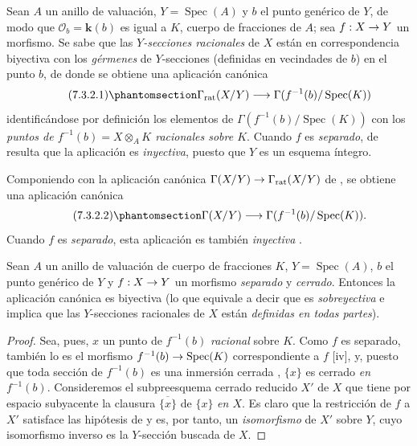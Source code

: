 \documentclass[oneside,10pt]{amsart}
\makeatletter
\newcommand{\ega@arrow}[2]{\mathchoice{#1}{#2}{#2}{#2}}
\renewcommand{\to}{\ega@arrow{\longrightarrow}{\rightarrow}}
\let\EGAOriginalLabel\label
\renewcommand{\label}[1]{\phantomsection\EGAOriginalLabel{#1}}
\makeatother
\begin{document}
\begin{env}[7.3.2]
\label{II.7.3.2-fr}
Sean $A$ un anillo de valuación, $Y=\operatorname{Spec}(A)$ y $b$ el punto genérico de $Y$, de modo que $\mathcal{O}_b=\boldsymbol{k}(b)$ es igual a $K$, cuerpo de fracciones de $A$;
sea $f:X\to Y$ un morfismo.
Se sabe  que las \emph{$Y$-secciones racionales} de $X$ están en correspondencia biyectiva con los \emph{gérmenes} de $Y$-secciones (definidas en vecindades de $b$) en el punto $b$, de donde se obtiene una aplicación canónica
\[
\tag{7.3.2.1}
\label{II.7.3.2.1-fr}
\Gamma_{\mathrm{rat}}(X/Y)\longrightarrow
\Gamma(f^{-1}(b)/\operatorname{Spec}(K))
\]
identificándose por definición  los elementos de $\Gamma(f^{-1}(b)/\operatorname{Spec}(K))$ con los \emph{puntos de $f^{-1}(b)=X\otimes_AK$ racionales sobre $K$}.
Cuando $f$ es \emph{separado}, de  resulta que la aplicación  es \emph{inyectiva}, puesto que $Y$ es un esquema íntegro.

Componiendo  con la aplicación canónica
$\Gamma(X/Y)\to\Gamma_{\mathrm{rat}}(X/Y)$
de , se obtiene una aplicación canónica
\[
\tag{7.3.2.2}
\label{II.7.3.2.2-fr}
\Gamma(X/Y)\longrightarrow \Gamma(f^{-1}(b)/\operatorname{Spec}(K)).
\]
Cuando $f$ es \emph{separado}, esta aplicación es también \emph{inyectiva} .
\end{env}


\begin{proposition}[7.3.3]
\label{II.7.3.3-fr}
Sean $A$ un anillo de valuación de cuerpo de fracciones $K$, $Y=\operatorname{Spec}(A)$, $b$ el punto genérico de $Y$ y $f:X\to Y$ un morfismo \emph{separado} y \emph{cerrado}.
Entonces la aplicación canónica \textup{} es biyectiva \textup{(lo que equivale a decir que es \emph{sobreyectiva} e implica que las $Y$-secciones racionales de $X$ están \emph{definidas en todas partes})}.
\end{proposition}

\begin{proof}
Sea, pues, $x$ un punto de $f^{-1}(b)$ \emph{racional} sobre $K$.
Como $f$ es separado, también lo es el morfismo $f^{-1}(b)\to\operatorname{Spec}(K)$ correspondiente a $f$ [iv], y, puesto que toda sección de $f^{-1}(b)$ es una inmersión cerrada , $\{x\}$ es cerrado \emph{en $f^{-1}(b)$}.
Consideremos el subpreesquema cerrado reducido $X'$ de $X$ que tiene por espacio subyacente la clausura $\overline{\{x\}}$ de $\{x\}$ \emph{en $X$}.
Es claro que la restricción de $f$ a $X'$ satisface las hipótesis de  y es, por tanto, un \emph{isomorfismo} de $X'$ sobre $Y$, cuyo isomorfismo inverso es la $Y$-sección buscada de $X$.
\end{proof}
\end{document}
